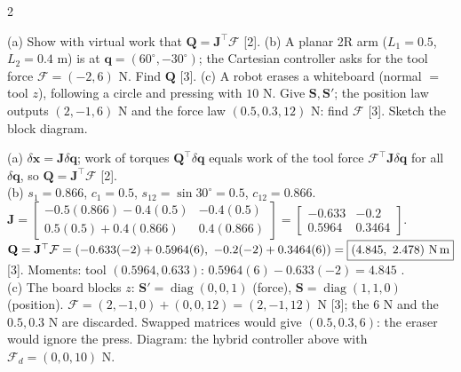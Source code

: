 \begin{multicols}{2}
\begin{examq}
(a) Show with virtual work that $\mathbf Q=\mathbf J^\top\mathcal F$ [2]. (b) A planar 2R arm ($L_1=0.5$, $L_2=0.4$ m) is at $\mathbf q=(60^\circ,-30^\circ)$; the Cartesian controller asks for the tool force $\mathcal F=(-2,6)$ N. Find $\mathbf Q$ [3]. (c) A robot erases a whiteboard (normal $=$ tool $z$), following a circle and pressing with $10$ N. Give $\mathbf S,\mathbf S'$; the position law outputs $(2,-1,6)$ N and the force law $(0.5,0.3,12)$ N: find $\mathcal F$ [3]. Sketch the block diagram.
\end{examq}
\columnbreak
\begin{examq}[EQ5: solution]
\solution
(a) $\delta\mathbf x=\mathbf J\delta\mathbf q$; work of torques $\mathbf Q^\top\delta\mathbf q$ equals work of the tool force $\mathcal F^\top\mathbf J\delta\mathbf q$ for all $\delta\mathbf q$, so $\mathbf Q=\mathbf J^\top\mathcal F$ [2].\\
(b) $s_1=0.866$, $c_1=0.5$, $s_{12}=\sin30^\circ=0.5$, $c_{12}=0.866$. $\mathbf J=\begin{bmatrix}-0.5(0.866)-0.4(0.5)&-0.4(0.5)\\0.5(0.5)+0.4(0.866)&0.4(0.866)\end{bmatrix}=\begin{bmatrix}-0.633&-0.2\\0.5964&0.3464\end{bmatrix}$. $\mathbf Q=\mathbf J^\top\mathcal F=(-0.633(-2)+0.5964(6),\ -0.2(-2)+0.3464(6))=\boxed{(4.845,\ 2.478)\text{ N\,m}}$ [3]. Moments: tool $(0.5964,0.633)$: $0.5964(6)-0.633(-2)=4.845$ \checkmark.\\
(c) The board blocks $z$: $\mathbf S'=\operatorname{diag}(0,0,1)$ (force), $\mathbf S=\operatorname{diag}(1,1,0)$ (position). $\mathcal F=(2,-1,0)+(0,0,12)=\boxed{(2,-1,12)\text{ N}}$ [3]; the $6$ N and the $0.5,0.3$ N are discarded. Swapped matrices would give $(0.5,0.3,6)$: the eraser would ignore the press. Diagram: the hybrid controller above with $\mathcal F_d=(0,0,10)$ N. \chk
\end{examq}

\end{multicols}
